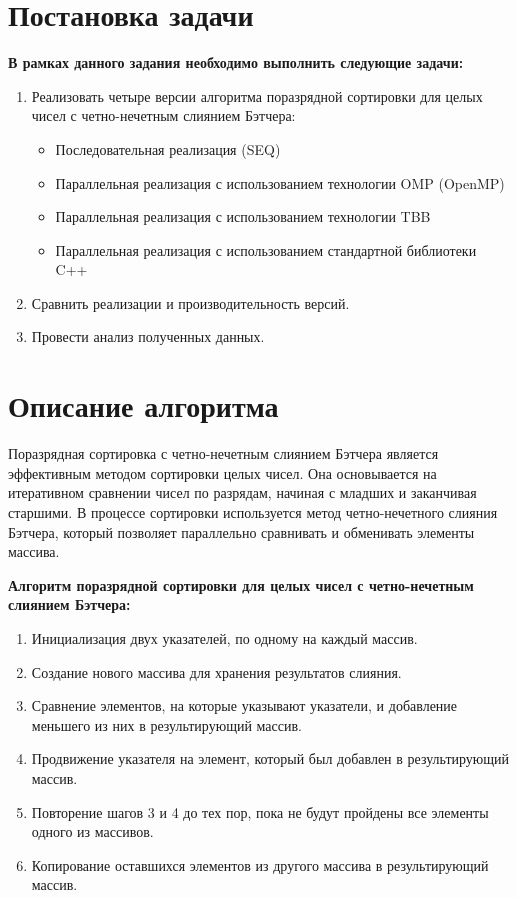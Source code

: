 \documentclass{report}
\begin{document}
\section*{Постановка задачи}
\par \textbf{В рамках данного задания необходимо выполнить следующие задачи:}
\begin{enumerate}
\item Реализовать четыре версии алгоритма поразрядной сортировки для целых чисел с четно-нечетным слиянием Бэтчера:
\begin{itemize}
\item Последовательная реализация (SEQ)
\item Параллельная реализация с использованием технологии OMP (OpenMP)
\item Параллельная реализация с использованием технологии TBB
\item Параллельная реализация с использованием стандартной библиотеки C++
\end{itemize}
\item Сравнить реализации и производительность версий.
\item Провести анализ полученных данных.
\end{enumerate}
\newpage

\section*{Описание алгоритма}
\par Поразрядная сортировка с четно-нечетным слиянием Бэтчера является эффективным методом сортировки целых чисел. Она основывается на итеративном сравнении чисел по разрядам, начиная с младших и заканчивая старшими. В процессе сортировки используется метод четно-нечетного слияния Бэтчера, который позволяет параллельно сравнивать и обменивать элементы массива.

\par \textbf{Алгоритм поразрядной сортировки для целых чисел с четно-нечетным слиянием Бэтчера:}

\begin{enumerate}
\item Инициализация двух указателей, по одному на каждый массив.
\item Создание нового массива для хранения результатов слияния.
\item Сравнение элементов, на которые указывают указатели, и добавление меньшего из них в результирующий массив.
\item Продвижение указателя на элемент, который был добавлен в результирующий массив.
\item Повторение шагов 3 и 4 до тех пор, пока не будут пройдены все элементы одного из массивов.
\item Копирование оставшихся элементов из другого массива в результирующий массив.
\end{enumerate}
\end{document}
